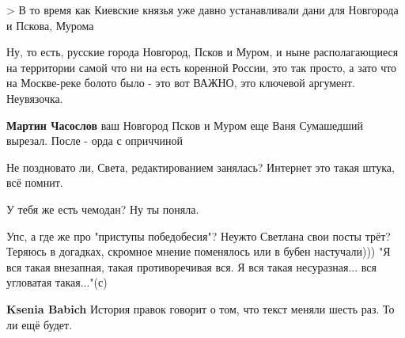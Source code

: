 \begin{itemize}
> В то время как Киевские князья уже давно устанавливали дани для Новгорода и Пскова, Мурома

Ну, то есть, русские города Новгород, Псков и Муром, и ныне располагающиеся на
территории самой что ни на есть коренной России, это так просто, а зато что на
Москве-реке болото было - это вот ВАЖНО, это ключевой аргумент. Неувязочка.

\begin{itemize}
 
\textbf{Мартин Часослов} ваш Новгород Псков и Муром еще Ваня Сумашедший вырезал. После - орда с оприччиной
\end{itemize}

 
Не поздновато ли, Света, редактированием занялась? Интернет это такая штука, всё помнит.

 
У тебя же есть чемодан? Ну ты поняла.

 

Упс, а где же про "приступы победобесия"? Неужто Светлана свои посты трёт?
Теряюсь в догадках, скромное мнение поменялось или в бубен настучали))) "Я вся
такая внезапная, такая противоречивая вся. Я вся такая несуразная... вся
угловатая такая..."(с)

\begin{itemize}
 
\textbf{Ksenia Babich} История правок говорит о том, что текст меняли шесть раз. То ли ещё будет.


\end{itemize}
\end{itemize}
